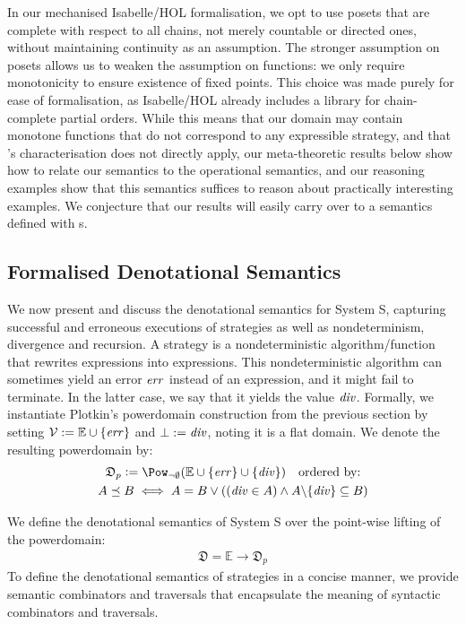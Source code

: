 In our mechanised Isabelle/HOL formalisation, we opt to use posets
that are complete with respect to all chains, not merely countable or directed
ones, without maintaining continuity as an assumption. The stronger
assumption on posets allows us to weaken the assumption on functions:
we only require monotonicity to ensure existence of fixed points. This
choice was made purely for ease of formalisation, as Isabelle/HOL
already includes a library for chain-complete partial orders. While this means that our domain may contain monotone functions that do not correspond to any expressible strategy, and that \citeauthor{hennessy-plotkin:plotkin-powerdomain}'s characterisation does not directly apply, our meta-theoretic results below
show how to relate our semantics to the operational semantics, and our
reasoning examples show that this semantics suffices to reason about
practically interesting examples. We conjecture that our results will easily carry over to a semantics defined with \wcpo{}s.

\subsection{Formalised Denotational Semantics}
\label{chap4:denotational}
We now present and discuss the denotational semantics for
System S, capturing successful and erroneous executions of strategies
as well as nondeterminism, divergence and recursion.  A strategy is a
nondeterministic algorithm/function that rewrites expressions into expressions.
This nondeterministic algorithm can sometimes yield an error $\mathit{err}$
instead of an expression, and it might fail to terminate.  In the
latter case, we say that it yields the value $\mathit{div}$.  Formally, we instantiate
Plotkin's powerdomain construction from
the previous section by setting $\mathcal{V} := \mathbb{E} \cup \{\mathit{err}\}$ and
$\bot := \mathit{div}$, noting it is a flat domain.
We denote the resulting powerdomain by:
\begin{gather*}\mathfrak{D}_p \metaDef \Pow_{\neg \emptyset}(\mathbb{E} \cup \{\err\} \cup \{\dive\}) \quad \text{ordered by:}\\
A \preceq B \iff  A = B \lor ((\dive \in A) \land A {\setminus} \{\dive\} \subseteq B)
\end{gather*}

We define the denotational semantics of System S over the point-wise lifting of
the powerdomain:
\begin{align*}
    \mathfrak{D} = \mathbb{E} \to \mathfrak{D}_p
\end{align*}
To define the denotational semantics of strategies in a concise
manner, we provide semantic combinators and traversals that
encapsulate the meaning of syntactic combinators and traversals.

